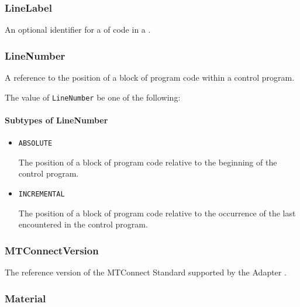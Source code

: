 \subsubsection{LineLabel}
\label{sec:LineLabel}



An optional identifier for a  of code in a .


\subsubsection{LineNumber}
\label{sec:LineNumber}



A reference to the position of a block of program code within a control program.


The value of \texttt{LineNumber} \MUST be one of the following: 

\FloatBarrier

\paragraph{Subtypes of LineNumber}\mbox{}
\label{sec:Subtypes of LineNumber}

\begin{itemize}

\item \texttt{ABSOLUTE}


The position of a block of program code relative to the beginning of the control program.

\item \texttt{INCREMENTAL}


The position of a block of program code relative to the occurrence of the last  encountered in the control program.


\end{itemize}

\subsubsection{MTConnectVersion}
\label{sec:MTConnectVersion}



The reference version of the MTConnect Standard supported by the \gls{Adapter}
.


\subsubsection{Material}




